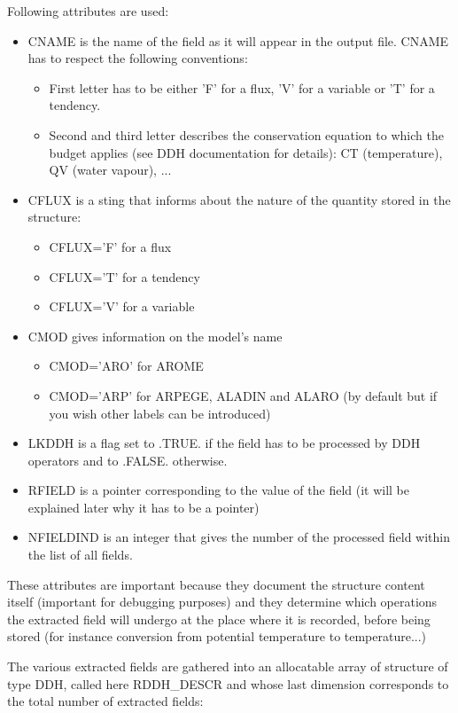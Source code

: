 Following attributes are used:
\begin{itemize}
 \item CNAME is the name of the field as it will appear in the output file. CNAME has to respect the following conventions:
\begin{itemize}
 \item First letter has to be either 'F' for a flux, 'V' for a variable or 'T' for a tendency.
 \item Second and third letter describes the conservation equation to which the budget applies (see DDH documentation for details):
CT (temperature), QV (water vapour), ...
\end{itemize}

 \item CFLUX is a sting that informs about the nature of the quantity stored in the structure:
\begin{itemize}
\item CFLUX='F' for a flux
\item CFLUX='T' for a tendency
\item CFLUX='V' for a variable
\end{itemize}
\item CMOD gives information on the model's name
\begin{itemize}
\item CMOD='ARO' for AROME
\item CMOD='ARP' for ARPEGE, ALADIN and ALARO (by default but if you wish other labels can be introduced)
\end{itemize}
\item LKDDH is a flag set to .TRUE. if the field has to be processed by DDH operators and to .FALSE. otherwise.
 \item RFIELD is a pointer corresponding to the value of the field (it will be explained later why it has to be a pointer)
\item NFIELDIND is an integer that gives the number of the processed field within the list of all fields.
\end{itemize}


These attributes are important because they document the structure content itself (important for debugging purposes) and they determine which operations the extracted field will undergo at the place where it is recorded, before being stored (for instance conversion from potential temperature to temperature...)

The various extracted fields are gathered into an allocatable array of structure of type DDH, called here RDDH\_DESCR and whose last dimension corresponds to the total number of extracted fields:

